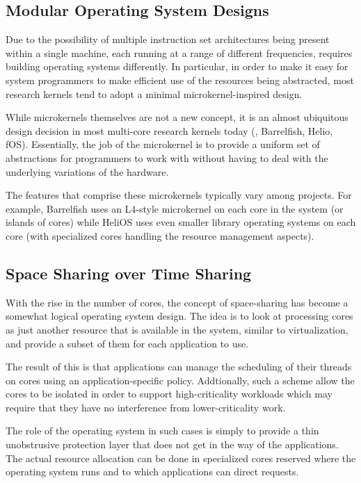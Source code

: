 \subsection{Modular Operating System Designs}
Due to the possibility of multiple instruction set architectures being present within a
single machine, each running at a range of different frequencies, requires building
operating systems differently. In particular, in order to make it easy for system
programmers to make efficient use of the resources being abstracted, most research
kernels tend to adopt a minimal microkernel-inspired design.

While microkernels themselves are not a new concept, it is an almost ubiquitous design
decision in most multi-core research kernels today (\eg, Barrelfish, Helio, fOS). Essentially, the job of the microkernel is to provide a uniform set of abstractions for programmers to work with without having to deal with the underlying variations of the hardware.

The features that comprise these microkernels typically vary among projects. For example, Barrelfish uses an L4-style microkernel on each core in the system (or islands of cores) while HeliOS uses even smaller library operating systems on each core (with specialized cores handling the resource management aspects).

\subsection{Space Sharing over Time Sharing}

With the rise in the number of cores, the concept of space-sharing has become a somewhat logical operating system design. The idea is to look at processing cores as
just another resource that is available in the system, similar to virtualization, and provide a subset of them for each application to use.

The result of this is that applications can manage the scheduling of their threads on
cores using an application-specific policy. Addtionally, such a scheme allow the cores
to be isolated in order to support high-criticality workloads which may require that
they have no interference from lower-criticality work.

The role of the operating system in such cases is simply to provide a thin unobstrusive
protection layer that does not get in the way of the applications. The actual resource
allocation can be done in specialized cores reserved where the operating system runs
and to which applications can direct requests.


